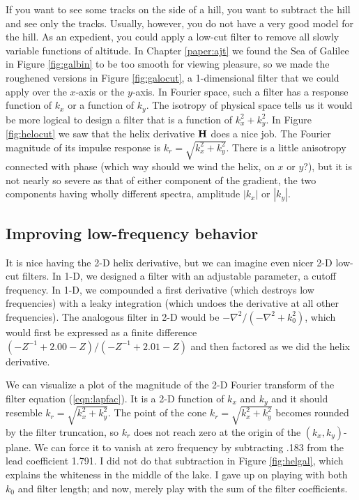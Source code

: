 \par
If you want to see some tracks on the side of a hill,
you want to subtract the hill and see only the tracks.
Usually, however, you do not have a very good model for the hill.
As an 
expedient, you could apply a low-cut filter to remove all
slowly variable functions of altitude.
In Chapter \ref{paper:ajt} we found the Sea of Galilee
in Figure \ref{fig:galbin} to be too smooth for viewing pleasure,
so we made the roughened versions
in Figure \ref{fig:galocut},
a 1-dimensional filter that we could apply
over the $x$-axis or the $y$-axis.
In Fourier space, such a filter has a response function of $k_x$
or a function of $k_y$.
The isotropy of physical space tells us
it would be more logical to design a filter that
is a function of
$k_x^2+k_y^2$.
In Figure \ref{fig:helocut} we saw that the helix derivative
$\bold H$
does a nice job.
The Fourier magnitude of its impulse response is $k_r=\sqrt{k_x^2+k_y^2}$.
There is a little anisotropy connected with phase (which way should
we wind the helix, on $x$ or $y$?), but it is
not nearly so severe as that of either component of the gradient,
the two components having wholly different spectra,
amplitude $|k_x|$ or $|k_y|$.

\subsection{Improving low-frequency behavior}
\par
It is nice having the 2-D helix derivative,
but we can imagine even nicer 2-D low-cut filters.
In 1-D, we designed a filter with an adjustable parameter,
a cutoff frequency.
In 1-D, we compounded
a first derivative (which destroys low frequencies)
with a leaky integration (which undoes the derivative at all other frequencies).
The analogous filter in 2-D would be
$-\nabla^2 /(-\nabla^2 + k_0^2)$,
which would first be expressed as a finite difference
$ (-Z^{-1} + 2.00 - Z) / (-Z^{-1} + 2.01 - Z)$
and then factored as we did the helix derivative.
\par
We can visualize a plot of the magnitude of the 2-D
Fourier transform of the filter equation (\ref{eqn:lapfac}).
It is a 2-D function of $k_x$ and $k_y$ and it should
resemble $k_r=\sqrt{k_x^2+k_y^2}$.
The point of the cone $k_r=\sqrt{k_x^2+k_y^2}$ becomes
rounded by the filter truncation, so
$k_r$ does not reach zero at the origin of the $(k_x,k_y)$-plane.
We can force it to vanish at zero frequency
by subtracting .183 from the lead coefficient 1.791.
I did not do that subtraction in Figure
\ref{fig:helgal},
which explains the whiteness in the middle of the lake.
I gave up on playing with both $k_0$ and filter length;
and now, merely play with the sum of the filter coefficients.
